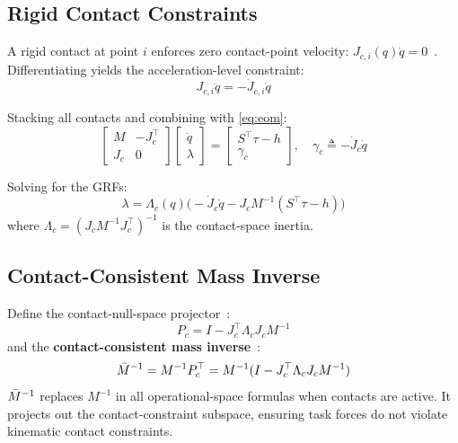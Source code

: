 \subsection{Rigid Contact Constraints}

A rigid contact at point $i$ enforces zero contact-point
velocity: $J_{c,i}(q)\dot{q}=0$~\cite{righetti2011inverse}.
Differentiating yields the acceleration-level constraint:
\begin{equation}\label{eq:contact_acc}
  J_{c,i}\ddot{q} = -\dot{J}_{c,i}\dot{q}
\end{equation}

Stacking all contacts and combining with \eqref{eq:eom}:
\begin{equation}\label{eq:KKT}
  \begin{bmatrix}M & -J_c^\top \\ J_c & 0\end{bmatrix}
  \begin{bmatrix}\ddot{q} \\ \lambda\end{bmatrix}
  =\begin{bmatrix}S^\top\tau-h \\ \gamma_c\end{bmatrix},
  \quad \gamma_c\triangleq-\dot{J}_c\dot{q}
\end{equation}

Solving for the GRFs:
\begin{equation}\label{eq:GRF}
  \lambda = \Lambda_c(q)\bigl(-\dot{J}_c\dot{q}-J_cM^{-1}(S^\top\tau-h)\bigr)
\end{equation}
where $\Lambda_c=(J_cM^{-1}J_c^\top)^{-1}$ is the contact-space inertia.

\subsection{Contact-Consistent Mass Inverse}

Define the contact-null-space projector~\cite{khatib1987unified,righetti2011inverse}:
\begin{equation}\label{eq:Pc}
  P_c = I - J_c^\top\Lambda_c J_c M^{-1}
\end{equation}
and the \textbf{contact-consistent mass
inverse}~\cite{khatib1987unified,righetti2011inverse}:
\begin{equation}\label{eq:Mbar}
  \bar{M}^{-1} = M^{-1}P_c^\top = M^{-1}(I-J_c^\top\Lambda_cJ_cM^{-1})
\end{equation}
$\bar{M}^{-1}$ replaces $M^{-1}$ in all operational-space formulas when contacts
are active. It projects out the contact-constraint subspace, ensuring task
forces do not violate kinematic contact constraints.

